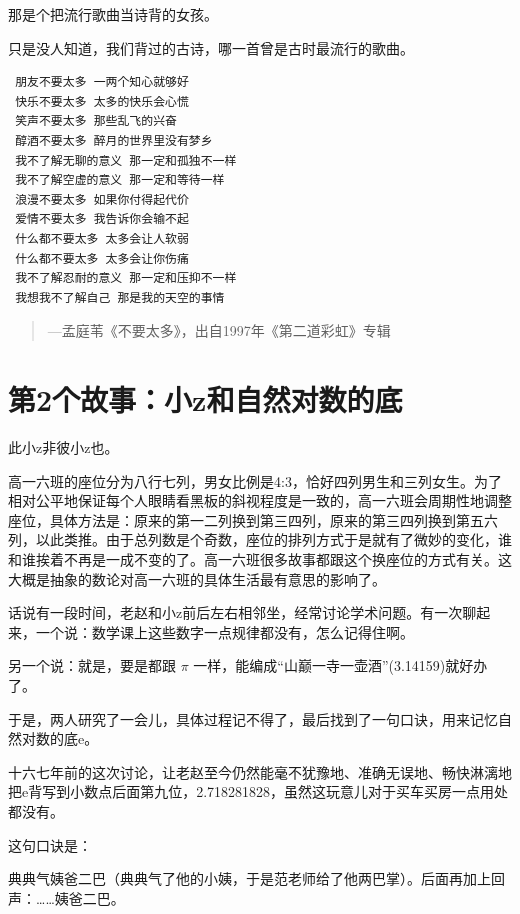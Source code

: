 \documentclass[openany]{ctexbook}
\begin{document}
那是个把流行歌曲当诗背的女孩。

只是没人知道，我们背过的古诗，哪一首曾是古时最流行的歌曲。

\begin{verbatim}
 朋友不要太多 一两个知心就够好 
 快乐不要太多 太多的快乐会心慌 
 笑声不要太多 那些乱飞的兴奋 
 醇酒不要太多 醉月的世界里没有梦乡
 我不了解无聊的意义 那一定和孤独不一样 
 我不了解空虚的意义 那一定和等待一样   
 浪漫不要太多 如果你付得起代价 
 爱情不要太多 我告诉你会输不起 
 什么都不要太多 太多会让人软弱 
 什么都不要太多 太多会让你伤痛   
 我不了解忍耐的意义 那一定和压抑不一样 
 我想我不了解自己 那是我的天空的事情
\end{verbatim}

\begin{quote}
\begin{flushright}---孟庭苇《不要太多》，出自1997年《第二道彩虹》专辑\end{flushright}
\end{quote}

\chapter*{第2个故事：小z和自然对数的底}\label{z2}

此小z非彼小z也。

高一六班的座位分为八行七列，男女比例是4:3，恰好四列男生和三列女生。为了相对公平地保证每个人眼睛看黑板的斜视程度是一致的，高一六班会周期性地调整座位，具体方法是：原来的第一二列换到第三四列，原来的第三四列换到第五六列，以此类推。由于总列数是个奇数，座位的排列方式于是就有了微妙的变化，谁和谁挨着不再是一成不变的了。高一六班很多故事都跟这个换座位的方式有关。这大概是抽象的数论对高一六班的具体生活最有意思的影响了。

话说有一段时间，老赵和小z前后左右相邻坐，经常讨论学术问题。有一次聊起来，一个说：数学课上这些数字一点规律都没有，怎么记得住啊。

另一个说：就是，要是都跟 \(\pi\)
一样，能编成``山巅一寺一壶酒''(3.14159)就好办了。

于是，两人研究了一会儿，具体过程记不得了，最后找到了一句口诀，用来记忆自然对数的底e。

十六七年前的这次讨论，让老赵至今仍然能毫不犹豫地、准确无误地、畅快淋漓地把e背写到小数点后面第九位，2.718281828，虽然这玩意儿对于买车买房一点用处都没有。

这句口诀是：

典典气姨爸二巴（典典气了他的小姨，于是范老师给了他两巴掌）。后面再加上回声：\ldots{}\ldots{}姨爸二巴。
\end{document}
